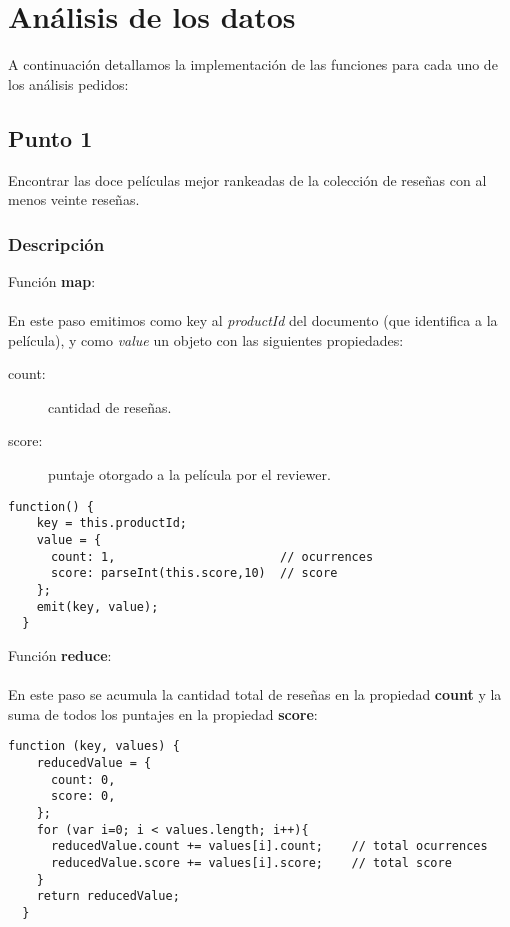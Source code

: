 \section{Análisis de los datos}

A continuación detallamos la implementación de las funciones para cada uno de los análisis pedidos:

\subsection{Punto 1}

Encontrar las doce películas mejor rankeadas de la colección de reseñas con al menos veinte reseñas.

\subsubsection{Descripción}

Función \textbf{map}:\\\\
En este paso emitimos como key al \emph{productId} del documento (que identifica a la película), y como \emph{value} un objeto con las siguientes propiedades:

\begin{description}
	\item[count:] cantidad de reseñas.
	\item[score:] puntaje otorgado a la película por el reviewer.
\end{description}

\begin{lstlisting}[frame=leftline]
  function() {
    key = this.productId;
    value = { 
      count: 1,                       // ocurrences
      score: parseInt(this.score,10)  // score
    };
    emit(key, value);
  }
\end{lstlisting}

Función \textbf{reduce}:\\\\
En este paso se acumula la cantidad total de reseñas en la propiedad \textbf{count} y la suma de todos los puntajes en la propiedad \textbf{score}:

\begin{lstlisting}[frame=leftline]
  function (key, values) {
    reducedValue = {
      count: 0,
      score: 0,
    };
    for (var i=0; i < values.length; i++){
      reducedValue.count += values[i].count;	// total ocurrences
      reducedValue.score += values[i].score;	// total score
    }
    return reducedValue;
  }
\end{lstlisting}

